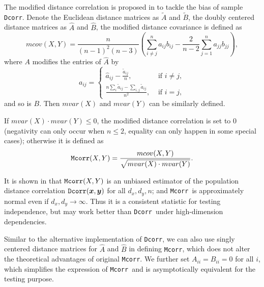 \documentclass[11pt]{article}
\providecommand{\sct}[1]{{\sc \texttt{#1}}}
\providecommand{\mb}[1]{\boldsymbol{#1}}
\newcommand{\Dcorr}{\sct{Dcorr}}
\newcommand{\Mcorr}{\sct{Mcorr}}
\begin{document}
The modified distance correlation is proposed in \cite{SzekelyRizzo2013a} to tackle the bias of sample \Dcorr. Denote the Euclidean distance matrices as $\tilde{A}$ and $\tilde{B}$, the doubly centered distance matrices as $\hat{A}$ and $\hat{B}$, the modified distance covariance is defined as
\begin{equation}
\label{mcovEqu}
mcov(X,Y)=\frac{n}{(n-1)^2(n-3)}(\sum_{i \neq j}^{n}a_{ij}b_{ij}-\frac{2}{n-2}\sum_{j=1}^{n}a_{jj}b_{jj}),
\end{equation}
where $A$ modifies the entries of $\hat{A}$ by
\[a_{ij} = \left\{
  \begin{array}{lr}
    \hat{a}_{ij}-\frac{\tilde{a}_{ij}}{n}, & \mbox{ if } i \neq j, \\
    \frac{n\sum_{i}\tilde{a}_{ij}-\sum_{i,j}\tilde{a}_{ij}}{n^2}, &\mbox{ if } i = j,
  \end{array}
\right.
\]
and so is $B$. Then $mvar(X)$ and $mvar(Y)$ can be similarly defined.

If $mvar(X) \cdot mvar(Y) \leq 0$, the modified distance correlation is set to $0$ (negativity can only occur when $n\leq 2$, equality can only happen in some special cases); otherwise it is defined as
\begin{equation}
\label{mcorrEqu}
\Mcorr(X,Y)=\frac{mcov(X,Y)}{\sqrt{mvar(X) \cdot mvar(Y)}}.
\end{equation}

It is shown in \cite{SzekelyRizzo2013a} that $\Mcorr(X,Y)$ is an unbiased estimator of the population distance correlation $\Dcorr(\mb{x},\mb{y})$ for all $d_{x}, d_{y}, n$; and \Mcorr~is approximately normal even if $d_{x},d_{y} \rightarrow \infty$. Thus it is a consistent statistic for testing independence, but may work better than \Dcorr~under high-dimension dependencies.

Similar to the alternative implementation of \Dcorr, we can also use singly centered distance matrices for $\hat{A}$ and $\hat{B}$ in defining \Mcorr, which does not alter the theoretical advantages of original \Mcorr. We further set $A_{ii}=B_{ii}=0$ for all $i$, which simplifies the expression of \Mcorr~and is asymptotically equivalent for the testing purpose.

\end{document}
